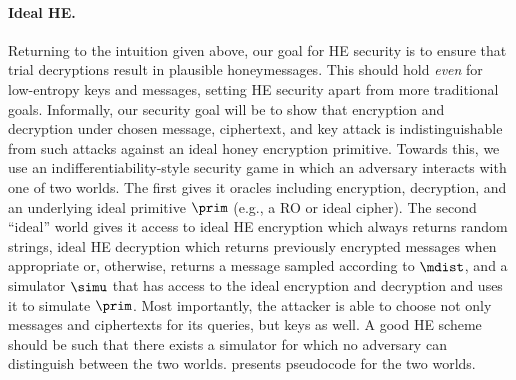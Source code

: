 \iffalse

\paragraph{Ideal HE.}  Returning to the intuition given above, our goal 
for HE security is to ensure that trial decryptions result in plausible 
honeymessages. This should hold \emph{even} for low-entropy keys and 
messages, setting HE security apart from more traditional goals.
Informally, our security goal will be to show that encryption and decryption under
chosen message, ciphertext, and key attack is indistinguishable from such attacks against
an ideal honey encryption primitive. Towards this, we use an indifferentiability-style
security game in which an adversary interacts with one of two worlds. The first gives it
oracles including encryption, decryption, and an underlying ideal primitive $\prim$ (e.g., a RO or 
ideal cipher). The second ``ideal'' world gives it access to ideal HE encryption which always
returns random strings, ideal HE decryption which returns previously encrypted messages when
appropriate or, otherwise, returns a message sampled according to
$\mdist$, and a simulator $\simu$ that has access to the ideal encryption and decryption and
uses it to simulate $\prim$. Most importantly, the attacker is able to choose not only messages and
ciphertexts for its queries, but keys as well. 
A good HE scheme should be such that there exists a simulator for which no
adversary can distinguish between the two worlds.
 presents pseudocode for the two worlds.

